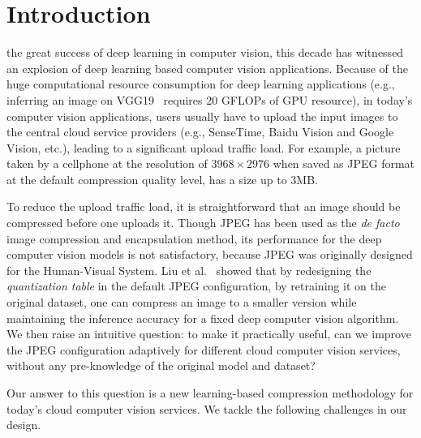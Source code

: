 \section{Introduction}
\label{sec: introduction}

 the great success of deep learning in computer vision, this decade has witnessed an explosion of deep learning based computer vision applications. Because of the huge computational resource consumption for deep learning applications (e.g., inferring an image on VGG19~\cite{VGG19} requires 20 GFLOPs of GPU resource), in today's computer vision applications, users usually have to upload the input images to the central cloud service providers (e.g., SenseTime, Baidu Vision and Google Vision, etc.), leading to a significant upload traffic load. For example, a picture taken by a cellphone at the resolution of $3968 \times 2976$ when saved as JPEG format at the default compression quality level, has a size up to 3MB. %

To reduce the upload traffic load, it is straightforward that an image should be compressed before one uploads it. Though JPEG has been used as the {\em de facto} image compression and encapsulation method, its performance for the deep computer vision models is not satisfactory, because JPEG was originally designed for the Human-Visual System. Liu et al.~\cite{DeepN-JPEG} showed that by redesigning the \emph{quantization table} in the default JPEG configuration, by retraining it on the original dataset, one can compress an image to a smaller version while maintaining the inference accuracy for a fixed deep computer vision algorithm. We then raise an intuitive question: to make it practically useful, can we improve the JPEG configuration adaptively for different cloud computer vision services, without any pre-knowledge of the original model and dataset? %

Our answer to this question is a new learning-based compression methodology for today's cloud computer vision services. We tackle the following challenges in our design. %

